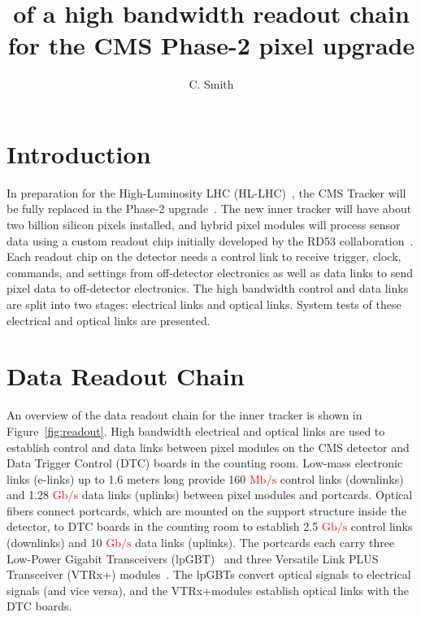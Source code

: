 \documentclass[a4paper,11pt]{article}
\title{\red{Characterization} of a high bandwidth readout chain for the CMS Phase-2 pixel upgrade}
\author{C. Smith}
\affiliation{The University of Kansas,\\Lawrence, Kansas 66045, USA}
\newcommand{\vtrxp}{VTRx+}
\newcommand{\fig}{Figure}
\newcommand{\mbps}{\ensuremath{\mathrm{Mb}/\mathrm{s}}\xspace}
\newcommand{\gbps}{\ensuremath{\mathrm{Gb}/\mathrm{s}}\xspace}
\newcommand{\red}{\textcolor{red}}
\begin{document}
\maketitle

\flushbottom


\section{Introduction}
\label{sec:introduction}

In preparation for the High-Luminosity LHC (HL-LHC)~\cite{ref:hllhc}, the CMS Tracker will be fully replaced in the Phase-2 upgrade~\cite{ref:cms,ref:tdr,ref:orfanelli}.
The new inner tracker will have about two billion silicon pixels installed,
and hybrid pixel modules will process sensor data using a custom readout chip initially developed by the RD53 collaboration~\cite{ref:rd53}.
Each readout chip on the detector needs a control link to receive trigger, clock, commands, and settings from off-detector electronics as well as data links to send pixel data to off-detector electronics.
The high bandwidth control and data links are split into two stages: electrical links and optical links.
System tests of these electrical and optical links are presented.

\section{Data Readout Chain}
\label{sec:readout}

An overview of the data readout chain for the inner tracker is shown in \fig~\ref{fig:readout}.
High bandwidth electrical and optical links are used to establish control and data links between pixel modules on the CMS detector and Data Trigger Control (DTC) boards in the counting room.
Low-mass electronic links (e-links) up to 1.6 meters long provide 160 \red{\mbps} control links (downlinks) and 1.28 \red{\gbps} data links (uplinks) between pixel modules and portcards.
Optical fibers connect portcards, which are mounted on the support structure inside the detector, to DTC boards in the counting room to establish 2.5 \red{\gbps} control links (downlinks) and 10 \red{\gbps} data links (uplinks).
The portcards each carry three Low-Power Gigabit Transceivers (lpGBT)~\cite{ref:lpgbt_1} and three Versatile Link PLUS Transceiver (\vtrxp) modules~\cite{ref:vtrxp}.
The lpGBTs convert optical signals to electrical signals (and vice versa), and the \vtrxp\space modules establish optical links with the DTC boards.
\end{document}
